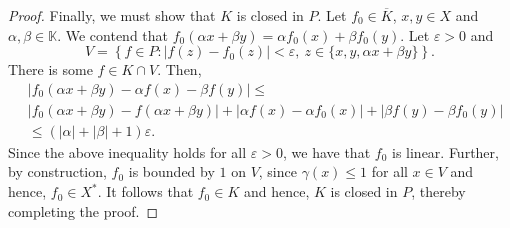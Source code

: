 \documentclass[11pt]{article}
\theoremstyle{thmstyle}
\theoremstyle{defstyle}
\newcommand{\R}{\mathbb{R}}
\newcommand{\bbC}{\mathbb{C}}
\newcommand{\K}{\mathbb{K}} %
\renewcommand{\le}{\leqslant}
\begin{document}
\begin{proof}
    Finally, we must show that $K$ is closed in $P$. Let $f_0\in\overline K$, $x,y\in X$ and $\alpha, \beta\in\K$. We contend that $f_0(\alpha x + \beta y) = \alpha f_0(x) + \beta f_0(y)$. Let $\varepsilon > 0$ and 
    \begin{equation*}
        V = \left\{f\in P\colon |f(z) - f_0(z)| < \varepsilon,~z\in\{x, y, \alpha x + \beta y\}\right\}.
    \end{equation*}
    There is some $f\in K\cap V$. Then, 
    \begin{align*}
        &|f_0(\alpha x + \beta y) - \alpha f(x) - \beta f(y)|\le\\
        &|f_0(\alpha x + \beta y) - f(\alpha x + \beta y)| + |\alpha f(x) - \alpha f_0(x)| + |\beta f(y) - \beta f_0(y)|\\
        &\le(|\alpha| + |\beta| + 1)\varepsilon.
    \end{align*}
    Since the above inequality holds for all $\varepsilon > 0$, we have that $f_0$ is linear. Further, by construction, $f_0$ is bounded by $1$ on $V$, since $\gamma(x)\le 1$ for all $x\in V$ and hence, $f_0\in X^\ast$. It follows that $f_0\in K$ and hence, $K$ is closed in $P$, thereby completing the proof.
\end{proof}
\end{document}

